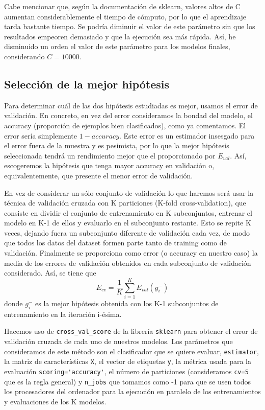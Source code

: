 \documentclass[a4]{article}
\begin{document}
Cabe mencionar que, según la documentación de sklearn, valores altos de C aumentan considerablemente el tiempo de cómputo, por lo que el aprendizaje tarda bastante tiempo. Se podría diminuir el valor de este parámetro sin que los resultados empeoren demasiado y que la ejecución sea más rápida. Así, he disminuido un orden el valor de este parámetro para los modelos finales, considerando $C=10000$.

\subsection{Selección de la mejor hipótesis}

Para determinar cuál de las dos hipótesis estudiadas es mejor, usamos el error de validación. En concreto, en vez del error consideramos la bondad del modelo, el accuracy (proporción de ejemplos bien clasificados), como ya comentamos. El error sería simplemente $ 1-accuracy $. Este error es un estimador insesgado para el error fuera de la muestra y es pesimista, por lo que la mejor hipótesis seleccionada tendrá un rendimiento mejor que el proporcionado por $E_{val}$. Así, escogeremos la hipótesis que tenga mayor accuracy en validación o, equivalentemente, que presente el menor error de validación. 

En vez de considerar un sólo conjunto de validación lo que haremos será usar la técnica de validación cruzada con K particiones (K-fold cross-validation), que consiste en dividir el conjunto de entrenamiento en K subconjuntos, entrenar el modelo en K-1 de ellos y evaluarlo en el subconjunto restante. Esto se repite K veces, dejando fuera un subconjunto diferente de validación cada vez, de modo que todos los datos del dataset formen parte tanto de training como de validación. Finalmente se proporciona como error (o accuracy en nuestro caso) la media de los errores de validación obtenidos en cada subconjunto de validación considerado. Así, se tiene que
$$E_{cv}=\frac{1}{K}\sum_{i=1}^{K}E_{val}(g_i^-)$$ donde $g_i^-$ es la mejor hipótesis obtenida con los K-1 subconjuntos de entrenamiento en la iteración i-ésima. 

Hacemos uso de \lstinline|cross_val_score| de la librería \lstinline|sklearn| para obtener el error de validación cruzada de cada uno de nuestros modelos. Los parámetros que consideramos de este método son el clasificador que se quiere evaluar, \lstinline|estimator|, la matriz de características \lstinline|X|, el vector de etiquetas \lstinline|y|, la métrica usada para la evaluación \lstinline|scoring='accuracy'|, el número de particiones (consideramos \lstinline|cv=5| que es la regla general) y \lstinline|n_jobs| que tomamos como -1 para que se usen todos los procesadores del ordenador para la ejecución en paralelo de los entrenamientos y evaluaciones de los K modelos. 
\end{document}
